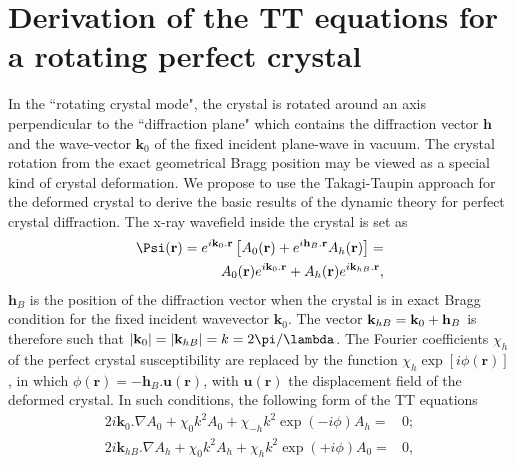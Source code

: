 \documentclass{iucr}
\begin{document}


\appendix

\section{Derivation of the TT equations for a rotating perfect crystal}
\label{appendix:rotating}

In the ``rotating crystal mode", the crystal is rotated around an axis perpendicular to the ``diffraction plane" which contains the diffraction vector $\textbf{h}$ and the wave-vector $\textbf{k}_0$ of the fixed incident plane-wave in vacuum. The crystal rotation from the exact geometrical Bragg position may be viewed as a special kind of crystal deformation. We propose to use the Takagi-Taupin approach for the deformed crystal to derive the basic results of the dynamic theory for perfect crystal diffraction. 
The x-ray wavefield inside the crystal is set as
\begin{subequations}\label{eq:rotatingField}
\label{eq:wavefieldappendix}
\begin{align}
        \Psi(\textbf r) = 
        e^{i \textbf k_0 . \textbf r} \left[
        A_0(\textbf r) + e^{i \textbf{h}_B . \textbf r} A_h(\textbf r)
        \right] = 
        \nonumber\\
        A_0(\textbf r) e^{i \textbf k_0 . \textbf r} + A_{h}(\textbf r) e^{i \textbf k_{hB} . \textbf r},
\end{align}
\end{subequations}
$\textbf{h}_B$ is the position of the diffraction vector when the crystal is in exact Bragg condition for the fixed incident wavevector $\textbf{k}_0$. The vector $\textbf k_{hB}= \textbf{k}_0 + \textbf{h}_B$  is therefore such that $|\textbf k_{0}|=|\textbf k_{hB}|=k=2 \pi / \lambda$. The Fourier coefficients $\chi_h$ of the perfect crystal susceptibility are replaced by the function $\chi_h \exp[i\phi(\textbf{r})]$, in which $\phi(\textbf{r}) = - \textbf{h}_B . \textbf{u}(\textbf{r})$, 
with $\textbf{u}(\textbf{r})$ the displacement field of the deformed crystal. In such conditions, the following form of the TT equations
\begin{subequations}
\label{eq:TTvectorappendix}
\begin{align}
2 i \textbf{k}_0 . \nabla A_0 + \chi_0 k^2 A_0 + \chi_{-h} k^2 \exp(-i\phi) A_h =& 0; \nonumber \\
2 i \textbf{k}_{hB} . \nabla A_h + \chi_0 k^2 A_h + \chi_{h} k^2 \exp(+i\phi) A_0 =& 0, \nonumber
\end{align}
\end{subequations}
\end{document}
